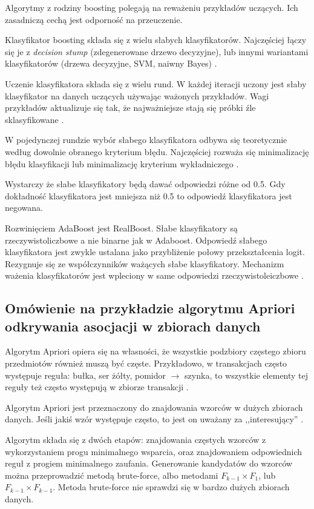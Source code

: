 \documentclass[wi]{zut}
\begin{document}
Algorytmy z rodziny boosting polegają na reważeniu przykładów uczących. Ich zasadniczą cechą jest odporność na przeuczenie.

Klasyfikator boosting składa się z wielu słabych klasyfikatorów. Najczęściej łączy się je z \emph{decision stump} (zdegenerowane drzewo decyzyjne), lub innymi wariantami klasyfikatorów (drzewa decyzyjne, SVM, naiwny Bayes) \cite{Klesk2020}.

Uczenie klasyfikatora składa się z wielu rund. W każdej iteracji uczony jest słaby klasyfikator na danych uczących używając ważonych przykładów. Wagi przykładów aktualizuje się tak, że najważniejsze stają się próbki źle sklasyfikowane \cite{Klesk2020}.

W pojedynczej rundzie wybór słabego klasyfikatora odbywa się teoretycznie według dowolnie obranego kryterium błędu. Najczęściej rozważa się minimalizację błędu klasyfikacji lub minimalizację kryterium wykładniczego \cite{Klesk2020}.

Wystarczy że słabe klasyfikatory będą dawać odpowiedzi różne od 0.5. Gdy dokładność klasyfikatora jest mniejsza niż 0.5 to odpowiedź klasyfikatora jest negowana.

Rozwinięciem AdaBoost jest RealBoost. Słabe klasyfikatory są rzeczywistoliczbowe a nie binarne jak w Adaboost. Odpowiedź słabego klasyfikatora jest zwykle ustalana jako przybliżenie połowy przekształcenia logit. Rezygnuje się ze współczynników ważących słabe klasyfikatory. Mechanizm ważenia klasyfikatorów jest wpleciony w same odpowiedzi rzeczywistoleiczbowe \cite{Klesk2020}.
\question


\subsection{Omówienie na przykładzie algorytmu Apriori odkrywania asocjacji w zbiorach danych}

Algorytm Apriori opiera się na własności, że wszystkie podzbiory częstego zbioru przedmiotów również muszą być częste. Przykładowo, w transakcjach często występuje reguła: bułka, ser żółty, pomidor $\rightarrow$ szynka, to wszystkie elementy tej reguły też często występują w zbiorze transakcji \cite{Kolodziejczyk2020}.

Algorytm Apriori jest przeznaczony do znajdowania wzorców w dużych zbiorach danych. Jeśli jakiś wzór występuje często, to jest on uważany za ,,interesujący'' \cite{Kolodziejczyk2020}.

Algorytm składa się z dwóch etapów: znajdowania częstych wzorców z wykorzystaniem progu minimalnego wsparcia, oraz znajdowaniem odpowiednich reguł z progiem minimalnego zaufania. Generowanie kandydatów do wzorców można przeprowadzić metodą brute-force, albo metodami $F_{k-1} \times F_1$, lub $F_{k-1} \times F_{k-1}$. Metoda brute-force nie sprawdzi się w bardzo dużych zbiorach danych.
\end{document}
